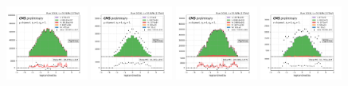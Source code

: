 \begin{figure}
    \includegraphics[width=0.24\textwidth]{chapters/Appendix/sectionQCD/figures/4j1b/mu_leptonOneEta_True_mcqcd.png}
    \includegraphics[width=0.24\textwidth]{chapters/Appendix/sectionQCD/figures/4j1b/mu_leptonOneEta_False.png}
    \includegraphics[width=0.24\textwidth]{chapters/Appendix/sectionQCD/figures/4j1b/e_leptonOneEta_True_mcqcd.png}
    \includegraphics[width=0.24\textwidth]{chapters/Appendix/sectionQCD/figures/4j1b/e_leptonOneEta_False.png}
    

\end{figure}
